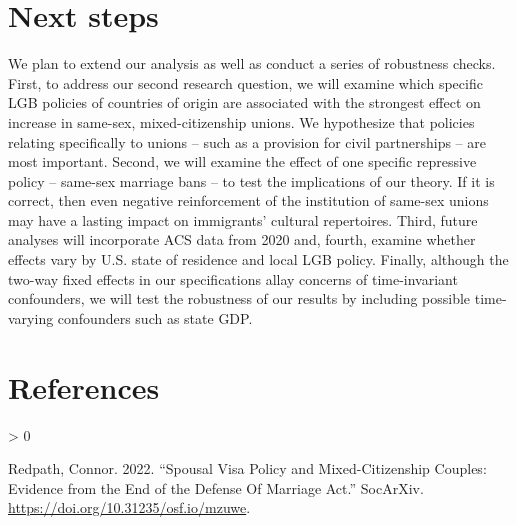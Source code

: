 \documentclass[
  11pt,
]{article}
\newlength{\cslhangindent}
\newenvironment{CSLReferences}[2] %
 {%
  \setlength{\parindent}{0pt}
  \ifodd #1 \everypar{\setlength{\hangindent}{\cslhangindent}}\ignorespaces\fi
  \ifnum #2 > 0
  \setlength{\parskip}{#2\baselineskip}
  \fi
 }%
 {}
\begin{document}
\hypertarget{next-steps}{%
\section{Next steps}\label{next-steps}}

We plan to extend our analysis as well as conduct a series of robustness checks. First, to address our second research question, we will examine which specific LGB policies of countries of origin are associated with the strongest effect on increase in same-sex, mixed-citizenship unions. We hypothesize that policies relating specifically to unions -- such as a provision for civil partnerships -- are most important. Second, we will examine the effect of one specific repressive policy -- same-sex marriage bans -- to test the implications of our theory. If it is correct, then even negative reinforcement of the institution of same-sex unions may have a lasting impact on immigrants' cultural repertoires. Third, future analyses will incorporate ACS data from 2020 and, fourth, examine whether effects vary by U.S. state of residence and local LGB policy. Finally, although the two-way fixed effects in our specifications allay concerns of time-invariant confounders, we will test the robustness of our results by including possible time-varying confounders such as state GDP.

\hypertarget{references}{%
\section*{References}\label{references}}

\hypertarget{refs}{}
\begin{CSLReferences}{1}{0}
\leavevmode\hypertarget{ref-redpath_2022_spousal}{}%
Redpath, Connor. 2022. {``Spousal {Visa Policy} and {Mixed-Citizenship Couples}: {Evidence} from the {End} of the {Defense Of Marriage Act}.''} {SocArXiv}. \url{https://doi.org/10.31235/osf.io/mzuwe}.

\end{CSLReferences}
\end{document}
